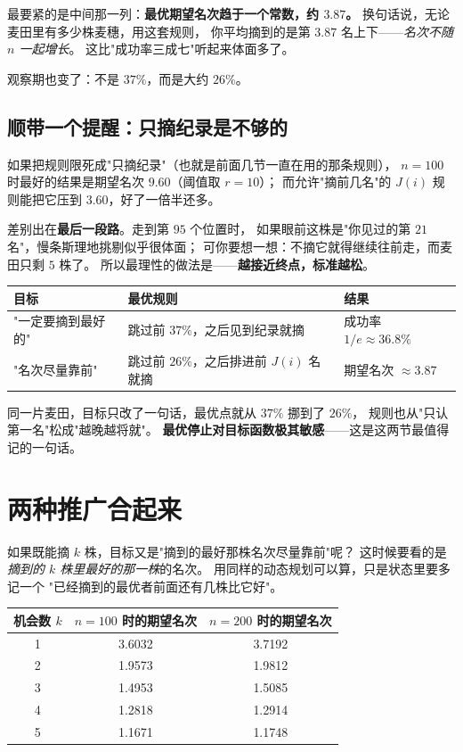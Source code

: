\documentclass[UTF8,11pt,fontset=macnew]{ctexart}
\begin{document}
最要紧的是中间那一列：\textbf{最优期望名次趋于一个常数，约 $3.87$。}
换句话说，无论麦田里有多少株麦穗，用这套规则，
你平均摘到的是第 $3.87$ 名上下——\emph{名次不随 $n$ 一起增长}。
这比"成功率三成七"听起来体面多了。

观察期也变了：不是 $37\%$，而是大约 $26\%$。

\subsection{顺带一个提醒：只摘纪录是不够的}

如果把规则限死成"只摘纪录"（也就是前面几节一直在用的那条规则），
$n=100$ 时最好的结果是期望名次 $9.60$（阈值取 $r=10$）；
而允许"摘前几名"的 $J(i)$ 规则能把它压到 $3.60$，好了一倍半还多。

差别出在\textbf{最后一段路}。走到第 $95$ 个位置时，
如果眼前这株是"你见过的第 $21$ 名"，慢条斯理地挑剔似乎很体面；
可你要想一想：不摘它就得继续往前走，而麦田只剩 $5$ 株了。
所以最理性的做法是——\textbf{越接近终点，标准越松}。

\begin{keybox}
\begin{center}
\small
\begin{tabular}{@{}l l l@{}}
\toprule
目标 & 最优规则 & 结果 \\
\midrule
"一定要摘到最好的" & 跳过前 $37\%$，之后见到纪录就摘 & 成功率 $1/e\approx36.8\%$ \\
"名次尽量靠前" & 跳过前 $26\%$，之后排进前 $J(i)$ 名就摘 & 期望名次 $\approx3.87$ \\
\bottomrule
\end{tabular}
\end{center}

同一片麦田，目标只改了一句话，最优点就从 $37\%$ 挪到了 $26\%$，
规则也从"只认第一名"松成"越晚越将就"。
\textbf{最优停止对目标函数极其敏感}——这是这两节最值得记的一句话。
\end{keybox}

\section{两种推广合起来}

如果既能摘 $k$ 株，目标又是"摘到的最好那株名次尽量靠前"呢？
这时候要看的是\emph{摘到的 $k$ 株里最好的那一株}的名次。
用同样的动态规划可以算，只是状态里要多记一个
"已经摘到的最优者前面还有几株比它好"。

\begin{center}
\begin{tabular}{c c c}
\toprule
机会数 $k$ & $n=100$ 时的期望名次 & $n=200$ 时的期望名次 \\
\midrule
1 & 3.6032 & 3.7192 \\
2 & 1.9573 & 1.9812 \\
3 & 1.4953 & 1.5085 \\
4 & 1.2818 & 1.2914 \\
5 & 1.1671 & 1.1748 \\
\bottomrule
\end{tabular}
\end{center}
\end{document}
